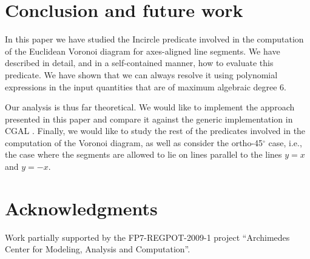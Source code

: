 \documentclass[letterpaper,11pt]{article}
\newcommand{\incircle}{\textsf{Incircle}\xspace}
\newcommand{\vor}{Voronoi\xspace}
\begin{document}
\section{Conclusion and future work}\label{sec:concl}

In this paper we have studied the \incircle predicate involved in the
computation of the Euclidean \vor diagram for axes-aligned line
segments. We have described in detail, and in a self-contained manner,
how to evaluate this predicate. We have shown that we can always
resolve it using polynomial expressions in the input quantities that
are of maximum algebraic degree 6.

Our analysis is thus far theoretical. We would like to implement the
approach presented in this paper and compare it against the generic
implementation in CGAL \cite{cgal:k-sdg2-10b}.
Finally, we would like to study 
the rest of the predicates involved in the computation of the \vor
diagram, as well as consider the ortho-45$^\circ$ case, i.e., the case
where the segments are allowed to lie on lines parallel to the lines
$y=x$ and $y=-x$.





\section*{Acknowledgments}
\noindent
Work partially supported by the FP7-REGPOT-2009-1 project ``Archimedes
Center for Modeling, Analysis and Computation''.




\end{document}

